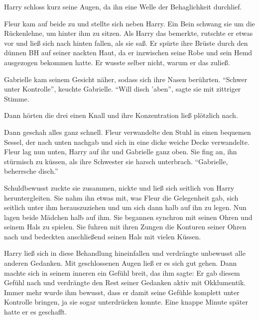 Harry schloss kurz seine Augen, da ihn eine Welle der Behaglichkeit durchlief.

\begin{abAchtzehn}

Fleur kam auf beide zu und stellte sich neben Harry. Ein Bein schwang sie um die Rückenlehne, um hinter ihm zu sitzen. Als Harry das bemerkte, rutschte er etwas vor und ließ sich nach hinten fallen, als sie saß. Er spürte ihre Brüste durch den dünnen BH auf seiner nackten Haut, da er inzwischen seine Robe und sein Hemd ausgezogen bekommen hatte. Er wusste selber nicht, warum er das zuließ.

Gabrielle kam seinem Gesicht näher, sodass sich ihre Nasen berührten. \enquote{Schwer unter Kontrolle\abs}, keuchte Gabrielle. \enquote{Will disch 'aben}, sagte sie mit zittriger Stimme.

Dann hörten die drei einen Knall und ihre Konzentration ließ plötzlich nach. 
\end{abAchtzehn}


Dann geschah alles ganz schnell. Fleur verwandelte den Stuhl in einen bequemen Sessel, der nach unten nachgab und sich in eine dicke weiche Decke verwandelte. Fleur lag nun unten, Harry auf ihr und Gabrielle ganz oben. Sie fing an, ihn stürmisch zu küssen, als ihre Schwester sie harsch unterbrach. \enquote{Gabrielle, beherrsche disch.}

\begin{abAchtzehn}

Schuldbewusst zuckte sie zusammen, nickte und ließ sich seitlich von Harry heruntergleiten. Sie nahm ihn etwas mit, was Fleur die Gelegenheit gab, sich seitlich unter ihm herauszuziehen und um sich dann halb auf ihn zu legen. Nun lagen beide Mädchen halb auf ihm. Sie begannen synchron mit seinen Ohren und seinem Hals zu spielen. Sie fuhren mit ihren Zungen die Konturen seiner Ohren nach und bedeckten anschließend seinen Hals mit vielen Küssen.

\end{abAchtzehn}


Harry ließ sich in diese Behandlung hineinfallen und verdrängte unbewusst alle anderen Gedanken. Mit geschlossenen Augen ließ er es sich gut gehen. Dann machte sich in seinem inneren ein Gefühl breit, das ihm sagte:  Er gab diesem Gefühl nach und verdrängte den Rest seiner Gedanken aktiv mit Okklumentik. Immer mehr wurde ihm bewusst, dass er damit seine Gefühle komplett unter Kontrolle bringen, ja sie sogar unterdrücken konnte. Eine knappe Minute später hatte er es geschafft.

